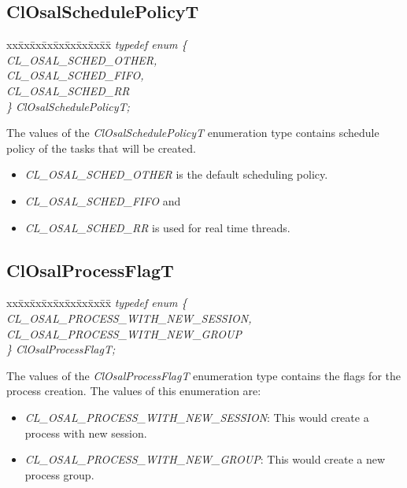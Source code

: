 \subsection{ClOsalSchedulePolicyT}
\begin{tabbing}
xx\=xx\=xx\=xx\=xx\=xx\=xx\=xx\=xx\=\kill
\textit{typedef enum \{}\\
\>\>\>\>\textit{CL\_OSAL\_SCHED\_OTHER,}\\
\>\>\>\>\textit{CL\_OSAL\_SCHED\_FIFO,}\\
\>\>\>\>\textit{CL\_OSAL\_SCHED\_RR}\\
\textit{\} ClOsalSchedulePolicyT;}\end{tabbing}
The values of the \textit{ClOsalSchedulePolicyT} enumeration type contains schedule policy of the tasks that will be created.
\begin{itemize}
\item
\textit{CL\_\-OSAL\_\-SCHED\_\-OTHER} is the default scheduling policy.
\item
\textit{CL\_\-OSAL\_\-SCHED\_\-FIFO} and 
\item
\textit{CL\_\-OSAL\_\-SCHED\_\-RR} is used for real time threads.
\end{itemize}



\subsection{ClOsalProcessFlagT}
\begin{tabbing}
xx\=xx\=xx\=xx\=xx\=xx\=xx\=xx\=xx\=\kill
\textit{typedef enum \{}\\
\>\>\>\>\textit{CL\_OSAL\_PROCESS\_WITH\_NEW\_SESSION,}\\
\>\>\>\>\textit{CL\_OSAL\_PROCESS\_WITH\_NEW\_GROUP}\\
\textit{\} ClOsalProcessFlagT;}\end{tabbing}
The values of the \textit{ClOsalProcessFlagT} enumeration type contains the flags for the process creation. The values of this enumeration are:
\begin{itemize}
\item
\textit{CL\_\-OSAL\_\-PROCESS\_\-WITH\_\-NEW\_\-SESSION}: This would create a process with new session.
\item
\textit{CL\_\-OSAL\_\-PROCESS\_\-WITH\_\-NEW\_\-GROUP}: This would create a new process group.
\end{itemize}




